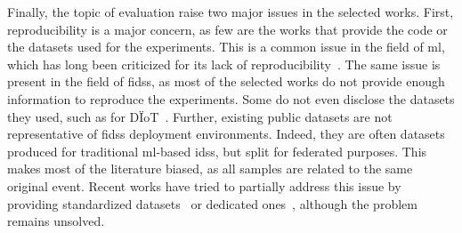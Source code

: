 Finally, the topic of evaluation raise two major issues in the selected works.
First, reproducibility is a major concern, as few are the works that provide the code or the datasets used for the experiments.
This is a common issue in the field of \gls{ml}, which has long been criticized for its lack of reproducibility~\cite{bajpai_ChallengesReproducibility_2017,arp_Dosdonts_2022}.
The same issue is present in the field of \glspl{fids}, as most of the selected works do not provide enough information to reproduce the experiments.
Some do not even disclose the datasets they used, such as \citeauthor{nguyen_DIoTFederatedSelflearning_2019} for DÏoT~\cite{nguyen_DIoTFederatedSelflearning_2019}.
Further, existing public datasets are not representative of \glspl{fids} deployment environments.
Indeed, they are often datasets produced for traditional \gls{ml}-based \glspl{ids}, but split for federated purposes.
This makes most of the literature biased, as all samples are related to the same original event.
Recent works have tried to partially address this issue by providing standardized datasets~\cite{sarhan_StandardFeatureSet_2022} or dedicated ones~\cite{ferrag_EdgeIIoTsetNewComprehensive_2022}, although the problem remains unsolved.



